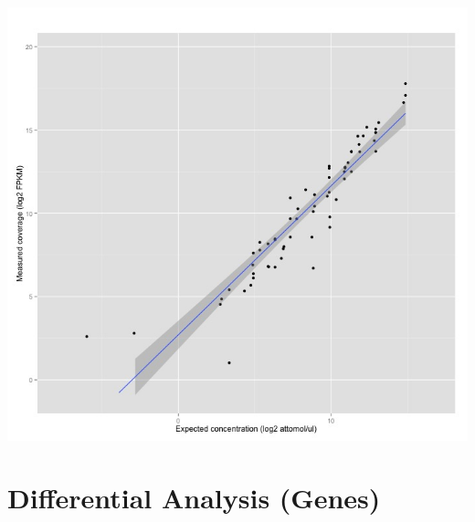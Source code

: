 \documentclass[]{article}
\begin{document}
\includegraphics{2.jpeg}

\pagebreak

\section{Differential Analysis
(Genes)}\label{differential-analysis-genes}
\end{document}
